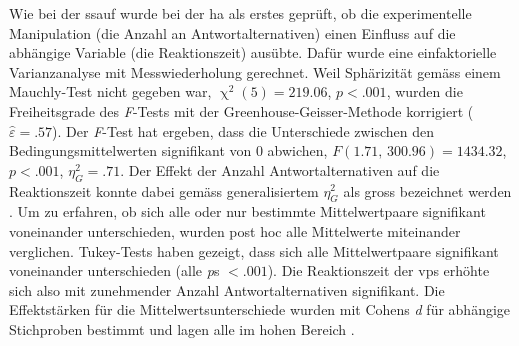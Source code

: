 \documentclass[11pt, twoside, a4paper]{book}		%
\begin{document}
Wie bei der \gls{ssauf} wurde bei der \gls{ha} als erstes geprüft, ob die experimentelle Manipulation (die Anzahl an Antwortalternativen) einen Einfluss auf die abhängige Variable (die Reaktionszeit) ausübte. Dafür wurde 
eine einfaktorielle Varianzanalyse mit Messwiederholung gerechnet.
Weil Sphärizität gemäss einem Mauchly-Test nicht gegeben war, $\upchi^2(5)=219.06$, $p<.001$, wurden die Freiheitsgrade des \textit{F}-Tests mit der Greenhouse-Geisser-Methode korrigiert ($\hat{\varepsilon}=.57$). Der \textit{F}-Test hat ergeben, dass die Unterschiede zwischen den Bedingungsmittelwerten signifikant von 0 abwichen, $F(1.71,\,300.96)=1434.32$, $p<.001$, $\eta_{G}^2=.71$. Der Effekt der Anzahl Antwortalternativen auf die Reaktionszeit konnte dabei gemäss generalisiertem $\eta_{G}^2$ \citep{Olejnik2003} als gross bezeichnet werden \citep[S. 383]{Bakeman2005}.
Um zu erfahren, ob sich alle oder nur bestimmte Mittelwertpaare signifikant voneinander unterschieden, wurden post hoc alle Mittelwerte miteinander verglichen.
Tukey-Tests haben gezeigt, dass sich alle Mittelwertpaare signifikant voneinander unterschieden (alle \textit{p}s $<.001$).
Die Reaktionszeit der \glspl{vp} erhöhte sich also mit zunehmender Anzahl Antwortalternativen signifikant.
Die Effektstärken für die Mittelwertsunterschiede wurden mit Cohens \textit{d} für abhängige Stichproben \citep{Gibbons1993} bestimmt und lagen alle im hohen Bereich \citep[][S. 40; siehe \autoref{tab:hick_effect_sizes}]{Cohen1988}.
\end{document}
